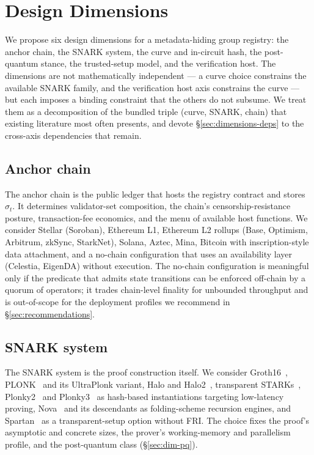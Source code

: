 \section{Design Dimensions}
\label{sec:dimensions}

We propose six design dimensions for a metadata-hiding group registry:
the anchor chain, the SNARK system, the curve and in-circuit hash, the
post-quantum stance, the trusted-setup model, and the verification
host. The dimensions are not mathematically independent --- a curve
choice constrains the available SNARK family, and the verification
host axis constrains the curve --- but each imposes a binding
constraint that the others do not subsume. We treat them as a
decomposition of the bundled triple (curve, SNARK, chain) that
existing literature most often presents, and devote
\S\ref{sec:dimensions-deps} to the cross-axis dependencies that
remain.

\subsection{Anchor chain}
\label{sec:dim-chain}

The anchor chain is the public ledger that hosts the registry contract
and stores $\sigma_t$. It determines validator-set composition, the
chain's censorship-resistance posture, transaction-fee economics, and
the menu of available host functions. We consider Stellar (Soroban),
Ethereum L1, Ethereum L2 rollups (Base, Optimism, Arbitrum, zkSync,
StarkNet), Solana, Aztec, Mina, Bitcoin with inscription-style data
attachment, and a no-chain configuration that uses an availability
layer (Celestia, EigenDA) without execution. The no-chain
configuration is meaningful only if the predicate that admits state
transitions can be enforced off-chain by a quorum of operators; it
trades chain-level finality for unbounded throughput and is
out-of-scope for the deployment profiles we recommend in
\S\ref{sec:recommendations}.

\subsection{SNARK system}
\label{sec:dim-snark}

The SNARK system is the proof construction itself. We consider
Groth16~\cite{groth-2016-onpairing}, PLONK~\cite{gabizon-2019-plonk}
and its UltraPlonk variant, Halo and Halo2~\cite{bowe-2019-halo},
transparent STARKs~\cite{ben-sasson-2018-stark},
Plonky2~\cite{plonky2-2022} and Plonky3~\cite{plonky3-spec} as
hash-based instantiations targeting low-latency proving,
Nova~\cite{kothapalli-2022-nova} and its descendants as folding-scheme
recursion engines, and Spartan~\cite{setty-2020-spartan} as a
transparent-setup option without FRI. The choice fixes the proof's
asymptotic and concrete sizes, the prover's working-memory and
parallelism profile, and the post-quantum class
(\S\ref{sec:dim-pq}).

